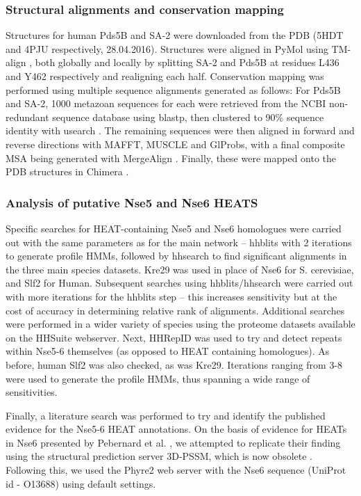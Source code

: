 \documentclass[a4paper,11pt,twoside,openright]{scrbook}
\begin{document}
\subsubsection{Structural alignments and conservation mapping}
Structures for human Pds5B and SA-2 were downloaded from the PDB (5HDT \cite{Ouyang2016} and 4PJU \cite{Hara2014} respectively, 28.04.2016). Structures were aligned in PyMol using TM-align \cite{PyMol2016,Zhang2005}, both globally and locally by splitting SA-2 and Pds5B at residues L436 and Y462 respectively and realigning each half. Conservation mapping was performed using multiple sequence alignments generated as follows: For Pds5B and SA-2, 1000 metazoan sequences for each were retrieved from the NCBI non-redundant sequence database using blastp, then clustered to 90\% sequence identity with usearch \cite{Altschul1990,Edgar2010}. The remaining sequences were then aligned in forward and reverse directions with MAFFT, MUSCLE and GlProbs, with a final composite MSA being generated with MergeAlign \cite{Katoh2002,Edgar2004,Ye2015,Collingridge2012}. Finally, these were mapped onto the PDB structures in Chimera \cite{Pettersen2004}.

\subsubsection{Analysis of putative Nse5 and Nse6 HEATS}
Specific searches for HEAT-containing Nse5 and Nse6 homologues were carried out with the same parameters as for the main network – hhblits with 2 iterations to generate profile HMMs, followed by hhsearch to find significant alignments in the three main species datasets. Kre29 was used in place of Nse6 for S. cerevisiae, and Slf2 for Human. Subsequent searches using hhblits/hhsearch were carried out with more iterations for the hhblits step – this increases sensitivity but at the cost of accuracy in determining relative rank of alignments. Additional searches were performed in a wider variety of species using the proteome datasets available on the HHSuite webserver. Next, HHRepID \cite{Biegert2008} was used to try and detect repeats within Nse5-6 themselves (as opposed to HEAT containing homologues). As before, human Slf2 was also checked, as was Kre29. Iterations ranging from 3-8 were used to generate the profile HMMs, thus spanning a wide range of sensitivities.

Finally, a literature search was performed to try and identify the published evidence for the Nse5-6 HEAT annotations. On the basis of evidence for HEATs in Nse6 presented by Pebernard et al. \cite{Pebernard2006}, we attempted to replicate their finding using the structural prediction server 3D-PSSM, which is now obsolete \cite{Kelley2000}. Following this, we used the Phyre2 web server \cite{Kelley2015} with the Nse6 sequence (UniProt id - O13688) using default settings.
\end{document}
